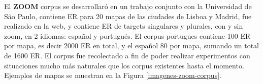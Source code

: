 \label{sec:corpusZOOM}
El {\bf ZOOM} corpus se desarrollar\'o en un trabajo conjunto con la Universidad de S\~ao Paulo, contiene ER para 20 mapas de las ciudades de Lisboa y Madrid, fue realizado en la web, y contiene ER de targets singulares y plurales, con y sin zoom, en 2 idiomas: espa\~nol y portugu\'es. El corpus portugues contiene 100 ER por mapa, es decir 2000 ER en total, y el espa\~nol 80 por mapa, sumando un total de 1600 ER. El corpus fue recolectado a fin de poder realizar experimentos con situaciones mucho m\'as naturales que los corpus existentes hasta el momento. Ejemplos de mapas se muestran en la Figura \ref{imagenes-zoom-corpus}.



